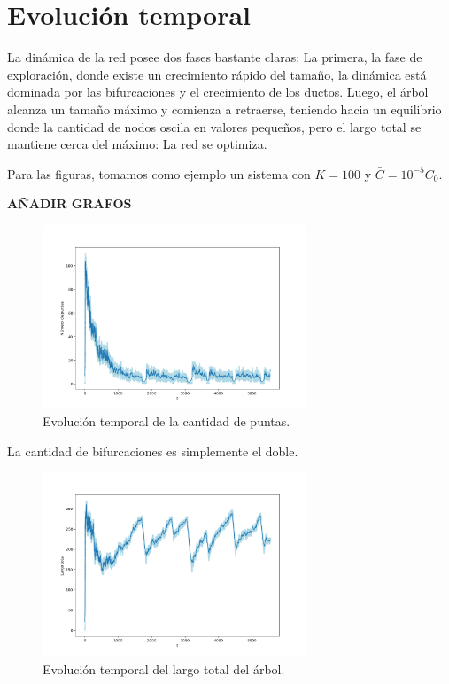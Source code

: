 \documentclass{article}
\begin{document}
\section{Evolución temporal}

La dinámica de la red posee dos fases bastante claras: 
La primera, la fase de exploración, donde existe un crecimiento rápido del tamaño,
la dinámica está dominada por las bifurcaciones y el crecimiento de los ductos.
Luego, el árbol alcanza un tamaño máximo y comienza a retraerse, teniendo hacia un equilibrio donde
la cantidad de nodos oscila en valores pequeños, pero el largo total se mantiene cerca del máximo: La red se optimiza.

Para las figuras, tomamos como ejemplo un sistema con $K = 100$ y $\bar{C} = 10^{-5}C_0$.

\textbf{AÑADIR GRAFOS}
\newpage
\begin{figure}[h!]
    \centering
    \includegraphics[width=0.7\textwidth]{graficos_inst/N_vs_tiempo.png}
    \caption{Evolución temporal de la cantidad de puntas.}
    \label{fig:evolucion_N}
\end{figure}
La cantidad de bifurcaciones es simplemente el doble.
\begin{figure}[h!]
    \centering
    \includegraphics[width=0.7\textwidth]{graficos_inst/largo_vs_tiempo.png}
    \caption{Evolución temporal del largo total del árbol.}
    \label{fig:evolucion_tamano}
\end{figure}
\end{document}
